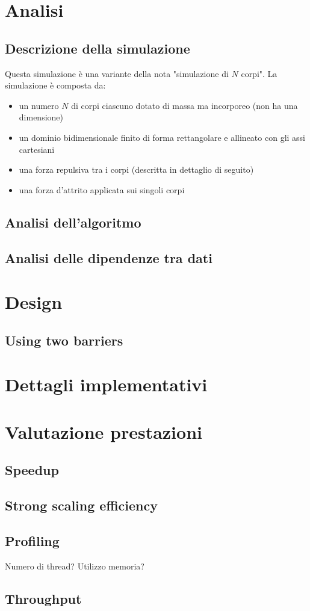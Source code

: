\documentclass{article}
\begin{document}
	
	\tableofcontents
	\newpage
	
	\section{Analisi}
	\subsection{Descrizione della simulazione}
	Questa simulazione è una variante della nota "simulazione di $N$ corpi". La simulazione è composta da:
	\begin{itemize}
		\item un numero $N$ di corpi ciascuno dotato di massa ma incorporeo (non ha una dimensione)
		\item un dominio bidimensionale finito di forma rettangolare e allineato con gli assi cartesiani
		\item una forza repulsiva tra i corpi (descritta in dettaglio di seguito)
		\item una forza d'attrito applicata sui singoli corpi
	\end{itemize}
	
	\subsection{Analisi dell'algoritmo}
	\subsection{Analisi delle dipendenze tra dati}
	
	\section{Design}
	\subsection{Using two barriers}
	
	\section{Dettagli implementativi}
	
	\section{Valutazione prestazioni}
	\subsection{Speedup}
	\subsection{Strong scaling efficiency}
	\subsection{Profiling}
	Numero di thread?
	Utilizzo memoria?
	\subsection{Throughput}
\end{document}
